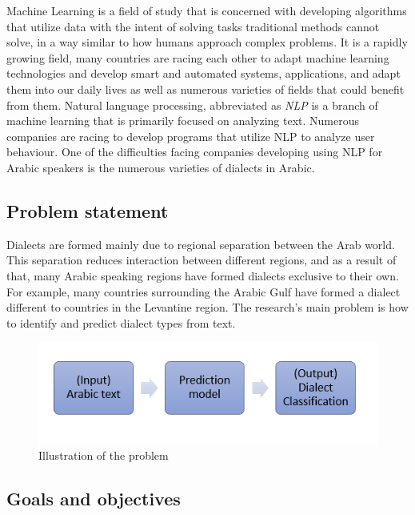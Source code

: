 \documentclass[12pt]{diazessay}
\begin{document}
    Machine Learning is a field of study that is concerned with developing algorithms that utilize data with the intent of solving tasks traditional methods cannot solve, in a way similar to how humans approach complex problems\cite{ibm_cloud_education_2020}. It is a rapidly growing field, many countries are racing each other to adapt machine learning technologies and develop smart and automated systems, applications, and adapt them into our daily lives as well as numerous varieties of fields that could benefit from them. Natural language processing, abbreviated as \textit{NLP} is a branch of machine learning that is primarily focused on analyzing text. Numerous companies are racing to develop programs that utilize NLP to analyze user behaviour. One of the difficulties facing companies developing using NLP for Arabic speakers is the numerous varieties of dialects in Arabic.


    \subsection{Problem statement}
    
    Dialects are formed mainly due to regional separation between the Arab world. This separation reduces interaction between different regions, and as a result of that, many Arabic speaking regions have formed dialects exclusive to their own. For example, many countries surrounding the Arabic Gulf have formed a dialect different to countries in the Levantine region. The research’s main problem is how to identify and predict dialect types from text.

 
    \begin{figure}[h]
        \centering
        \includegraphics[scale=0.7]{Figures/problem_statment.png}
        \caption{Illustration of the problem}
        \label{fig:cmp}
    \end{figure}
        
    
    \subsection{Goals and objectives}
    
\end{document}
